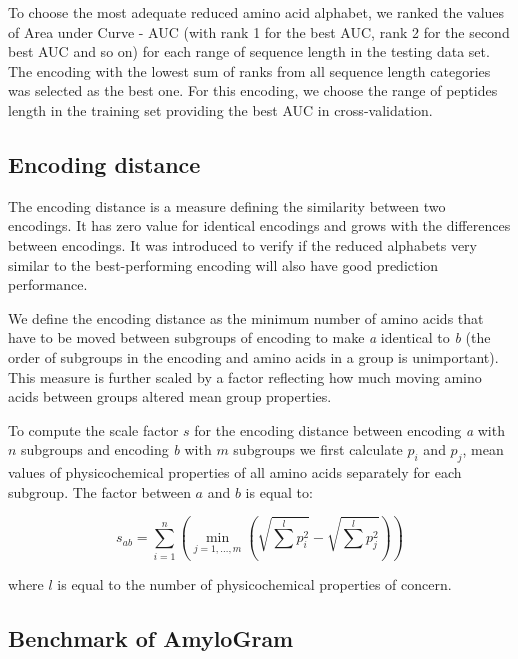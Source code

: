 \documentclass[a4,center,fleqn]{NAR}
\begin{document}
  To choose the most adequate reduced amino acid alphabet, we ranked the values 
%
%
%
of Area under Curve - AUC (with rank 1 for the best AUC, rank 2 for the second 
best AUC and so on) for each range of sequence length in the testing data set. 
The encoding with the lowest sum of ranks from all sequence length categories 
was selected as the best one. For this encoding, we choose the range of peptides 
length in the training set providing the best AUC in cross-validation.

\subsection{Encoding distance}
The encoding distance is a measure defining the similarity between two 
encodings. It has zero value for identical encodings and grows with the 
differences between encodings. It was introduced to verify if the reduced 
alphabets very similar to the best-performing encoding will also have good 
prediction performance.

  We define the encoding distance as the minimum number of amino acids that 
have to be moved between subgroups of encoding to make \textit{a} identical to 
\textit{b} (the order of subgroups in the encoding and amino acids in a group 
is unimportant). This measure is further scaled by a factor reflecting how 
much moving amino acids between groups altered mean group properties. 

To compute the scale factor $s$ for the encoding distance between 
encoding \textit{a} with $n$ subgroups and encoding \textit{b} with $m$ 
subgroups we first calculate $p_i$ and $p_j$, mean values of physicochemical 
properties of all amino acids separately for each subgroup. The factor between 
%
%
%
$a$ and $b$ is equal to: 

$$
s_{ab} = \sum^n_{i = 1}  \left( \min_{j=1,\dots,m} \left(\sqrt{\sum^l p_{i}^2} 
- \sqrt{\sum^l p_{j}^2} \right) \right)
$$
 
where $l$ is equal to the number of physicochemical properties of concern.

\subsection{Benchmark of AmyloGram}
\end{document}
